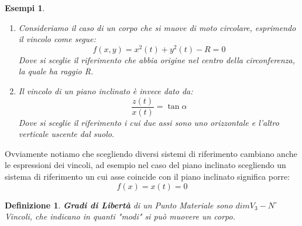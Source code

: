 \documentclass{article}
\newtheorem{defn}{Definizione}[section]
\newtheorem{example}{Esempi}[subsection]
\newcommand{\note}{\noindent {\quad \bf \underline{Osservazione:}} \quad}
\begin{document}
\begin{example}
\begin{enumerate}
    \item Consideriamo il caso di un corpo che si muove di moto circolare, esprimendo il vincolo come segue:
    \[f(x,y)=x^2(t)+y^2(t)-R=0\]
    Dove si sceglie il riferimento che abbia origine nel centro della circonferenza, la quale ha raggio R.
    \item Il vincolo di un piano inclinato è invece dato da:
    \[\frac{z(t)}{x(t)}=\tan\alpha\]
    Dove si sceglie il riferimento i cui due assi sono uno orizzontale e l'altro verticale uscente dal suolo.
\end{enumerate}
\end{example}


\note Ovviamente notiamo che scegliendo diversi sistemi di riferimento cambiano anche le espressioni dei vincoli, ad esempio nel caso del piano inclinato scegliendo un sistema di riferimento un cui asse coincide con il piano inclinato significa porre:
\[f(x)=x(t)=0\]

\begin{defn}
\textbf{Gradi di Libertà} di un Punto Materiale sono $dimV_3-N^\circ$Vincoli, che indicano in quanti "modi" si può muovere un corpo.
\end{defn}
\end{document}
